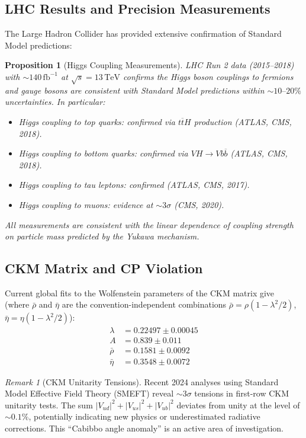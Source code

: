 \documentclass[12pt]{article}
\newtheorem{proposition}[theorem]{Proposition}
\theoremstyle{definition}
\theoremstyle{remark}
\newtheorem{remark}[theorem]{Remark}
\newcommand{\TeV}{\,\mathrm{TeV}}
\begin{document}
\subsection{LHC Results and Precision Measurements}

The Large Hadron Collider has provided extensive confirmation of Standard Model predictions:

\begin{proposition}[Higgs Coupling Measurements]
\label{prop:higgscouplings}
LHC Run 2 data (2015--2018) with $\sim 140\,\mathrm{fb}^{-1}$ at $\sqrt{s} = 13\TeV$ confirms the Higgs boson couplings to fermions and gauge bosons are consistent with Standard Model predictions within $\sim 10\text{--}20\%$ uncertainties. In particular:
\begin{itemize}
    \item Higgs coupling to top quarks: confirmed via $t\overline{t}H$ production (ATLAS, CMS, 2018).
    \item Higgs coupling to bottom quarks: confirmed via $VH \to Vb\overline{b}$ (ATLAS, CMS, 2018).
    \item Higgs coupling to tau leptons: confirmed (ATLAS, CMS, 2017).
    \item Higgs coupling to muons: evidence at $\sim 3\sigma$ (CMS, 2020).
\end{itemize}
All measurements are consistent with the linear dependence of coupling strength on particle mass predicted by the Yukawa mechanism.
\end{proposition}

\subsection{CKM Matrix and CP Violation}

Current global fits to the Wolfenstein parameters of the CKM matrix give~\cite{PDG2024} (where $\bar{\rho}$ and $\bar{\eta}$ are the convention-independent combinations $\bar{\rho} = \rho(1 - \lambda^2/2)$, $\bar{\eta} = \eta(1 - \lambda^2/2)$):
\begin{align}
\lambda &= 0.22497 \pm 0.00045 \\
A &= 0.839 \pm 0.011 \\
\bar{\rho} &= 0.1581 \pm 0.0092 \\
\bar{\eta} &= 0.3548 \pm 0.0072
\end{align}

\begin{remark}[CKM Unitarity Tensions]
\label{rem:ckmtension}
Recent 2024 analyses using Standard Model Effective Field Theory (SMEFT) reveal $\sim 3\sigma$ tensions in first-row CKM unitarity tests. The sum $|V_{ud}|^2 + |V_{us}|^2 + |V_{ub}|^2$ deviates from unity at the level of $\sim 0.1\%$, potentially indicating new physics or underestimated radiative corrections. This ``Cabibbo angle anomaly'' is an active area of investigation.
\end{remark}
\end{document}
